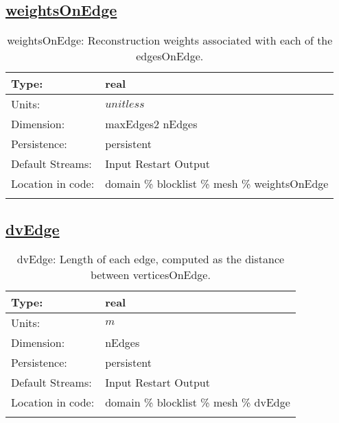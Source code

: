 \subsection[weightsOnEdge]{\hyperref[sec:var_tab_mesh]{weightsOnEdge}}
\label{subsec:var_sec_mesh_weightsOnEdge}
\begin{center}
\begin{longtable}{| p{2.0in} | p{4.0in} |}
        \hline 
        Type: & real \\
        \hline 
        Units: & $unitless$ \\
        \hline 
        Dimension: & maxEdges2 nEdges \\
        \hline 
        Persistence: & persistent \\
        \hline 
		 Default Streams: & Input Restart Output  \\
        \hline 
		 Location in code: & domain \% blocklist \% mesh \% weightsOnEdge \\
		 \hline 
    \caption{weightsOnEdge: Reconstruction weights associated with each of the edgesOnEdge.}
\end{longtable}
\end{center}
\subsection[dvEdge]{\hyperref[sec:var_tab_mesh]{dvEdge}}
\label{subsec:var_sec_mesh_dvEdge}
\begin{center}
\begin{longtable}{| p{2.0in} | p{4.0in} |}
        \hline 
        Type: & real \\
        \hline 
        Units: & $m$ \\
        \hline 
        Dimension: & nEdges \\
        \hline 
        Persistence: & persistent \\
        \hline 
		 Default Streams: & Input Restart Output  \\
        \hline 
		 Location in code: & domain \% blocklist \% mesh \% dvEdge \\
		 \hline 
    \caption{dvEdge: Length of each edge, computed as the distance between verticesOnEdge.}
\end{longtable}
\end{center}
